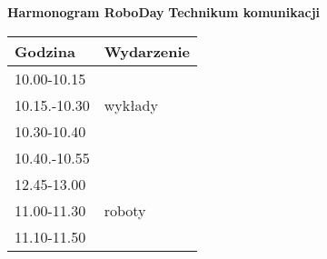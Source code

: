 \documentclass{article}
\begin{document}
\begin{center}
\Large\textbf{Harmonogram RoboDay}
\large\textbf{Technikum komunikacji}
\end{center}
\vspace{1cm}
\begin{center}
\begin{tabular}{|l|l|}
\hline
\textbf{Godzina} & \textbf{Wydarzenie} \\
\hline
10.00-10.15 &  \\
\hline
10.15.-10.30 & wykłady \\
\hline
10.30-10.40 &  \\
\hline
10.40.-10.55 &  \\
\hline
12.45-13.00 &  \\
\hline
11.00-11.30 & roboty \\
\hline
11.10-11.50 &  \\
\hline
\end{tabular}
\end{center}
\end{document}
